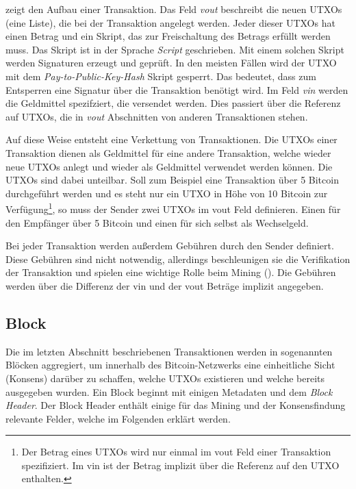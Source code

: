 \documentclass[ngerman,runningheads,a4paper]{llncs}[2018/03/10]
\begin{document}
 zeigt den Aufbau einer Transaktion. Das Feld \textit{vout} beschreibt die neuen UTXOs (eine Liste), die bei der Transaktion angelegt werden. Jeder dieser UTXOs hat einen Betrag und ein Skript, das zur Freischaltung des Betrags erfüllt werden muss. Das Skript ist in der Sprache \textit{Script} geschrieben. Mit einem solchen Skript werden Signaturen erzeugt und geprüft. In den meisten Fällen wird der UTXO mit dem \textit{Pay-to-Public-Key-Hash} \citep{bitcoinbook} Skript gesperrt. Das bedeutet, dass zum Entsperren eine Signatur über die Transaktion benötigt wird.  Im Feld \textit{vin} werden die Geldmittel spezifziert, die versendet werden. Dies passiert über die Referenz auf UTXOs, die in \textit{vout} Abschnitten von anderen Transaktionen stehen.

Auf diese Weise entsteht eine Verkettung von Transaktionen. Die UTXOs einer Transaktion dienen als Geldmittel für eine andere Transaktion, welche wieder neue UTXOs anlegt und wieder als Geldmittel verwendet werden können. Die UTXOs sind dabei unteilbar. Soll zum Beispiel eine Transaktion über 5 Bitcoin durchgeführt werden und es steht nur ein UTXO in Höhe von 10 Bitcoin zur Verfügung\footnote{Der Betrag eines UTXOs wird nur einmal im vout Feld einer Transaktion spezifiziert. Im vin ist der Betrag implizit über die Referenz auf den UTXO enthalten.}, so muss der Sender zwei UTXOs im vout Feld definieren. Einen für den Empfänger über 5 Bitcoin und einen für sich selbst als Wechselgeld.

Bei jeder Transaktion werden außerdem Gebühren durch den Sender definiert. Diese Gebühren sind nicht notwendig, allerdings beschleunigen sie die Verifikation der Transaktion und spielen eine wichtige Rolle beim Mining (). Die Gebühren werden über die Differenz der vin und der vout Beträge implizit angegeben.

\subsection{Block}\label{sec:block}

Die im letzten Abschnitt beschriebenen Transaktionen werden in sogenannten Blöcken aggregiert, um innerhalb des Bitcoin-Netzwerks eine einheitliche Sicht (Konsens) darüber zu schaffen, welche UTXOs existieren und welche bereits ausgegeben wurden. Ein Block beginnt mit einigen Metadaten und dem \textit{Block Header}. Der Block Header enthält einige für das Mining und der Konsensfindung relevante Felder, welche im Folgenden erklärt werden.
\end{document}
